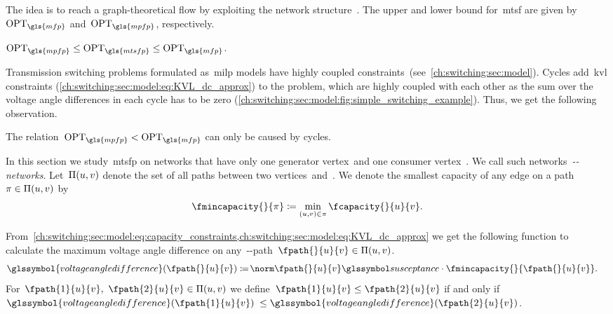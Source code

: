 The idea is to reach a graph-theoretical flow by exploiting the network
structure~. The upper and lower bound for~\gls{mtsf}
are given by~$\opt_{\gls{mfp}}$ and~$\opt_{\gls{mpfp}}$, respectively.
%
\begin{lemma}
    $\opt_{\gls{mpfp}}\leq\opt_{\gls{mtsfp}}\leq\opt_{\gls{mfp}}$.
    \label{lem:opt_relation_mpf_msf_mf}
\end{lemma}
%
Transmission switching problems formulated as~\gls{milp} models have highly
coupled constraints~(see~\cref{ch:switching:sec:model}). Cycles
add~\gls{kvl} constraints (\cref{ch:switching:sec:model:eq:KVL_dc_approx})
to the problem, which are highly coupled with each other as the sum over the
voltage angle differences in each cycle has to be zero
(\cref{ch:switching:sec:model:fig:simple_switching_example}). Thus, we get the
following observation.
\begin{observation}%
  The relation~$\opt_{\gls{mpfp}} < \opt_{\gls{mfp}}$ can only be caused
  by cycles.
  \label{obs:complex_cycles}
\end{observation}%
%
In this section we study~\gls{mtsfp} on networks that have only one 
generator vertex~\source and one consumer vertex~\sink. We call such 
networks~\emph{\source-\sink-networks}.
% 
Let~$\Pi(u,v)$ denote
the set of all paths between two vertices~\vertexa and~\vertexb. We denote
the smallest capacity of any edge on a
path~$\pi\in\Pi(u,v)$ by
%
\begin{align}%
    \fmincapacity{}{\pathu}\coloneqq
    \min_{(\vertexa,\vertexb)\in\pathu}
    \fcapacity{}{\vertexa}{\vertexb}.
    \label{eq:edge_min_capacity}
\end{align}%
%  

From~\cref{ch:switching:sec:model:eq:capacity_constraints,ch:switching:sec:model:eq:KVL_dc_approx}
we get the following function to calculate the maximum voltage angle difference
on any~\vertexa-\vertexb-path~$\fpath{}{\vertexa}{\vertexb}\in\paths
(\vertexa,\vertexb)$.
% 
\begin{align}
    \glssymbol{voltageangledifference}(\fpath{}{\vertexa}{\vertexb})&
    \coloneqq\!
    \bnorm{\fpath{}{\vertexa}{\vertexb}}\cdot\fmincapacity{}{\fpath{}
      {\vertexa}{\vertexb}}.
    \label{eq:update_function}
\end{align}
% 
% 
For~$\fpath{1}{\vertexa}{\vertexb},$
$\fpath{2}{\vertexa}{\vertexb}\in\paths(\vertexa,\vertexb)$ we
define~$\fpath{1}{\vertexa}{\vertexb}\leq\fpath{2}{\vertexa}{\vertexb}$
if and only if~$\glssymbol{voltageangledifference}(\fpath{1}{\vertexa}{\vertexb})$ 
$\leq\glssymbol{voltageangledifference}(\fpath{2}{\vertexa}{\vertexb})$.
% 
